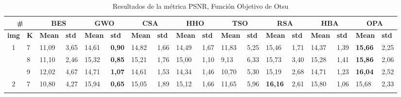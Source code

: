 \documentclass[conference]{IEEEtran}
\begin{document}
\begin{table}[]
	\caption{Resultados de la métrica PSNR, Función Objetivo de Otsu}
	\begin{tabular}{|cl|ll|ll|ll|ll|ll|ll|ll|ll|}
		\hline
		\multicolumn{2}{|c|}{\textbf{\#}} & \multicolumn{2}{c|}{\textbf{BES}} & \multicolumn{2}{c|}{\textbf{GWO}} & \multicolumn{2}{c|}{\textbf{CSA}} & \multicolumn{2}{c|}{\textbf{HHO}} & \multicolumn{2}{c|}{\textbf{TSO}} & \multicolumn{2}{c|}{\textbf{RSA}} & \multicolumn{2}{c|}{\textbf{HBA}} & \multicolumn{2}{c|}{\textbf{OPA}} \\ \hline
		\multicolumn{1}{|l|}{\textbf{img}} & \textbf{K} & \multicolumn{1}{l|}{\textbf{Mean}} & \textbf{std} & \multicolumn{1}{l|}{\textbf{Mean}} & \textbf{std} & \multicolumn{1}{l|}{\textbf{Mean}} & \textbf{std} & \multicolumn{1}{l|}{\textbf{Mean}} & \textbf{std} & \multicolumn{1}{l|}{\textbf{Mean}} & \textbf{std} & \multicolumn{1}{l|}{\textbf{Mean}} & \textbf{std} & \multicolumn{1}{l|}{\textbf{Mean}} & \textbf{std} & \multicolumn{1}{l|}{\textbf{Mean}} & \textbf{std} \\ \hline
		\multicolumn{1}{|c|}{\multirow{3}{*}{1}} & 7 & \multicolumn{1}{l|}{11,09} & 3,65 & \multicolumn{1}{l|}{14,61} & \textbf{0,90} & \multicolumn{1}{l|}{14,82} & 1,66 & \multicolumn{1}{l|}{14,49} & 1,67 & \multicolumn{1}{l|}{11,83} & 5,25 & \multicolumn{1}{l|}{15,46} & 1,71 & \multicolumn{1}{l|}{14,37} & 1,39 & \multicolumn{1}{l|}{\textbf{15,66}} & 2,25 \\ \cline{2-18} 
		\multicolumn{1}{|c|}{} & 8 & \multicolumn{1}{l|}{11,10} & 2,46 & \multicolumn{1}{l|}{15,32} & \textbf{0,85} & \multicolumn{1}{l|}{15,21} & 1,76 & \multicolumn{1}{l|}{15,00} & 1,10 & \multicolumn{1}{l|}{9,13} & 6,33 & \multicolumn{1}{l|}{15,73} & 3,40 & \multicolumn{1}{l|}{15,28} & 1,41 & \multicolumn{1}{l|}{\textbf{15,86}} & 2,06 \\ \cline{2-18} 
		\multicolumn{1}{|c|}{} & 9 & \multicolumn{1}{l|}{12,02} & 4,67 & \multicolumn{1}{l|}{14,71} & \textbf{1,07} & \multicolumn{1}{l|}{14,61} & 1,53 & \multicolumn{1}{l|}{14,34} & 1,46 & \multicolumn{1}{l|}{10,70} & 5,30 & \multicolumn{1}{l|}{15,19} & 2,68 & \multicolumn{1}{l|}{14,71} & 1,23 & \multicolumn{1}{l|}{\textbf{16,04}} & 2,52 \\ \hline
		\multicolumn{1}{|c|}{\multirow{3}{*}{2}} & 7 & \multicolumn{1}{l|}{10,80} & 4,27 & \multicolumn{1}{l|}{15,94} & \textbf{0,65} & \multicolumn{1}{l|}{15,05} & 1,89 & \multicolumn{1}{l|}{15,12} & 1,66 & \multicolumn{1}{l|}{11,65} & 5,96 & \multicolumn{1}{l|}{\textbf{16,16}} & 2,61 & \multicolumn{1}{l|}{15,80} & 1,06 & \multicolumn{1}{l|}{15,68} & 2,33 \\ \cline{2-18} 

\end{tabular}
\end{table}
\end{document}
